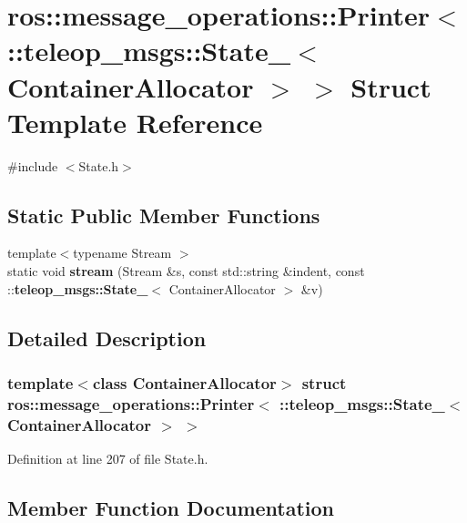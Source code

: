 \section{ros::message\_\-operations::Printer$<$ ::teleop\_\-msgs::State\_\-$<$ ContainerAllocator $>$ $>$ Struct Template Reference}
\label{structros_1_1message__operations_1_1Printer_3_01_1_1teleop__msgs_1_1State___3_01ContainerAllocator_01_4_01_4}


{\ttfamily \#include $<$State.h$>$}

\subsection*{Static Public Member Functions}
\begin{DoxyCompactItemize}
\item 
{\footnotesize template$<$typename Stream $>$ }\\static void {\bf stream} (Stream \&s, const std::string \&indent, const ::{\bf teleop\_\-msgs::State\_\-}$<$ ContainerAllocator $>$ \&v)
\end{DoxyCompactItemize}


\subsection{Detailed Description}
\subsubsection*{template$<$class ContainerAllocator$>$ struct ros::message\_\-operations::Printer$<$ ::teleop\_\-msgs::State\_\-$<$ ContainerAllocator $>$ $>$}



Definition at line 207 of file State.h.



\subsection{Member Function Documentation}
